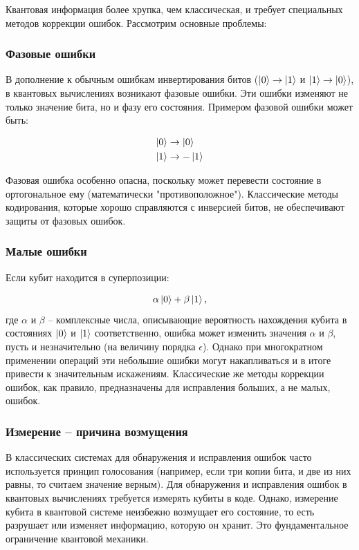 \documentclass[12pt,a4paper]{article}
\begin{document}
Квантовая информация более хрупка, чем классическая, и требует специальных методов коррекции ошибок. Рассмотрим основные проблемы:

\subsubsection{Фазовые ошибки}

В дополнение к обычным ошибкам инвертирования битов (\(\ket{0}\rightarrow\ket{1}\) и \(\ket{1}\rightarrow\ket{0}\)), в квантовых вычислениях возникают фазовые ошибки. Эти ошибки изменяют не только значение бита, но и фазу его состояния. Примером фазовой ошибки может быть:

\begin{align}
	\ket{0} &\rightarrow \ket{0} \\
	\ket{1} &\rightarrow -\ket{1}
\end{align}

Фазовая ошибка особенно опасна, поскольку может перевести состояние в ортогональное ему (математически "противоположное"). Классические методы кодирования, которые хорошо справляются с инверсией битов, не обеспечивают защиты от фазовых ошибок.

\subsubsection{Малые ошибки}

Если кубит находится в суперпозиции:

\begin{equation}
	\alpha\ket{0} + \beta\ket{1},
\end{equation}
где \(\alpha\) и \(\beta\) – комплексные числа, описывающие вероятность нахождения кубита в состояниях \(\ket{0}\) и \(\ket{1}\) соответственно, ошибка может изменить значения \(\alpha\) и \(\beta\), пусть и незначительно (на величину порядка \(\epsilon\)). Однако при многократном применении операций эти небольшие ошибки могут накапливаться и в итоге привести к значительным искажениям. Классические же методы коррекции ошибок, как правило, предназначены для исправления больших, а не малых, ошибок.

\subsubsection{Измерение – причина возмущения}

В классических системах для обнаружения и исправления ошибок часто используется принцип голосования (например, если три копии бита, и две из них равны, то считаем значение верным). Для обнаружения и исправления ошибок в квантовых вычислениях требуется измерять кубиты в коде. Однако, измерение кубита в квантовой системе неизбежно возмущает его состояние, то есть разрушает или изменяет информацию, которую он хранит. Это фундаментальное ограничение квантовой механики.
\end{document}
